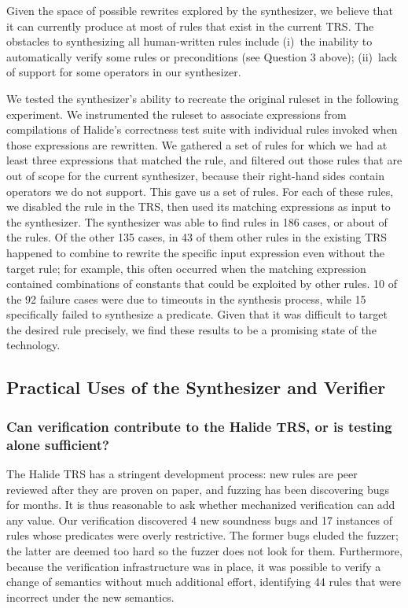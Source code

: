 \documentclass[acmsmall,review]{acmart}\settopmatter{printfolios=true,printccs=false,printacmref=false}
\newcommand{\NumRulesFixed}{{\color{black} 4}\xspace}
\newcommand{\NumPredicatesRelaxed}{{\color{black} 17}\xspace}
\begin{document}
Given the space of possible rewrites explored by the synthesizer, we believe that it can currently produce at most \PercentPossibleToSynth{} of rules that exist in the current TRS. The obstacles to synthesizing all human-written rules include (i)~the inability to automatically verify some rules or preconditions (see Question 3 above); (ii)~lack of support for some operators in our synthesizer. 

We tested the synthesizer's ability to recreate the original ruleset in the following experiment. We instrumented the ruleset to associate expressions from compilations of Halide's correctness test suite with individual rules invoked when those expressions are rewritten. We gathered a set of rules for which we had at least three expressions that matched the rule, and filtered out those rules that are out of scope for the current synthesizer, because their right-hand sides contain operators we do not support. This gave us a set of \NumRulesInCorrectnessExperiment{} rules. For each of these rules, we disabled the rule in the TRS, then used its matching expressions as input to the synthesizer. The synthesizer was able to find rules in 186 cases, or about \PercentRulesResynthesized{} of the rules. Of the other 135 cases, in 43 of them other rules in the existing TRS happened to combine to rewrite the specific input expression even without the target rule; for example, this often occurred when the matching expression contained combinations of constants that could be exploited by other rules. 10 of the 92 failure cases were due to timeouts in the synthesis process, while 15 specifically failed to synthesize a predicate. Given that it was difficult to target the desired rule precisely, we find these results to be a promising state of the technology.


\subsection{Practical Uses of the Synthesizer and Verifier}

\subsubsection{Can verification contribute to the Halide TRS, or is testing alone sufficient?}
\label{sec:eval-correctness}

The Halide TRS has a stringent development process: new rules are peer reviewed after they are proven on paper, and fuzzing has been discovering bugs for months. It is thus reasonable to ask whether mechanized verification can add any value. Our verification discovered \NumRulesFixed new soundness bugs and \NumPredicatesRelaxed instances of rules whose predicates were overly restrictive. The former bugs eluded the fuzzer; the latter are deemed too hard so the fuzzer does not look for them. Furthermore, because the verification infrastructure was in place, it was possible to verify a change of semantics without much additional effort, identifying 44 rules that were incorrect under the new semantics.
\end{document}
